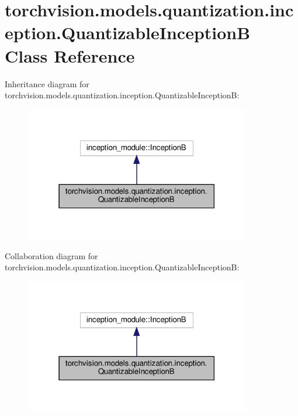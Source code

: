 \hypertarget{classtorchvision_1_1models_1_1quantization_1_1inception_1_1QuantizableInceptionB}{}\section{torchvision.\+models.\+quantization.\+inception.\+Quantizable\+InceptionB Class Reference}
\label{classtorchvision_1_1models_1_1quantization_1_1inception_1_1QuantizableInceptionB}


Inheritance diagram for torchvision.\+models.\+quantization.\+inception.\+Quantizable\+InceptionB\+:
\nopagebreak
\begin{figure}[H]
\begin{center}
\leavevmode
\includegraphics[width=279pt]{classtorchvision_1_1models_1_1quantization_1_1inception_1_1QuantizableInceptionB__inherit__graph}
\end{center}
\end{figure}


Collaboration diagram for torchvision.\+models.\+quantization.\+inception.\+Quantizable\+InceptionB\+:
\nopagebreak
\begin{figure}[H]
\begin{center}
\leavevmode
\includegraphics[width=279pt]{classtorchvision_1_1models_1_1quantization_1_1inception_1_1QuantizableInceptionB__coll__graph}
\end{center}
\end{figure}
